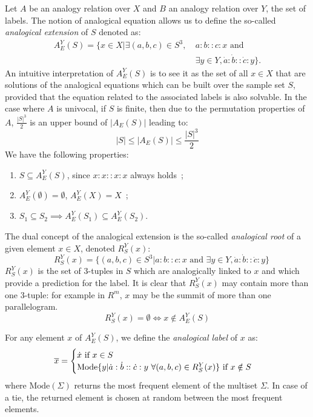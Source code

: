 {Let $A$ be an analogy relation over $X$ and $B$ an analogy relation over $Y$, the set of labels.
The notion of analogical equation allows us to define the so-called {\it
analogical extension} of $S$ denoted as:
\begin{align*}
  A_E^Y(S)=\{ x \in X | \exists (a,b,c) \in S^3, ~ & a:b::c:x \mbox{ and }\\
& \exists y \in Y, \dot{a}:\dot{b}::\dot{c}:y\}.
\end{align*}
An intuitive interpretation of $A_E^Y(S)$ is to see it as the set of all $x \in
X$ that are solutions of the analogical equations which can be built over the
sample set $S$, provided that the equation related to the associated labels is also solvable.
In the case where $A$ is univocal, if $S$ is finite, then due to the
permutation properties of $A$, $\frac{|S|^3}{2}$ is an upper bound of
$|A_E(S)|$ leading to: $$|S| \leq |A_E(S)| \leq \frac{|S|^3}{2}$$
We have the following properties:
\begin{enumerate}
\item $S \subseteq A_E^Y(S)$, since $x:x::x:x$ always holds~;
\item$A_E^Y(\emptyset)=\emptyset$, $A_E^Y(X)=X$~;
\item $S_1 \subseteq S_2 \implies A_E^Y(S_1) \subseteq A_E^Y(S_2)$.
\end{enumerate}

The dual concept of the analogical extension is the so-called {\it analogical
root} of a given element $x \in X$, denoted $R_{S}^Y(x)$:
$$\quad R_{S}^Y(x) = \{(a, b, c) \in S^3 | a:b::c:x \mbox{ and } \exists
y \in Y, \dot{a}:\dot{b}::\dot{c}:y\}$$
$R_{S}^Y(x)$ is the set of 3-tuples in $S$ which are analogically linked to
$x$ and which provide a prediction for the label. It is clear that $R_{S}^Y(x)$ may contain more than one 3-tuple: for
example in $R^m$, $x$ may be the summit of more than one parallelogram.
$$R_{S}^Y(x) = \emptyset \iff x \notin A_E^Y(S)$$

For any element $x$ of $A_E^Y(S)$, we define the \textit{analogical label} of
$x$ as:
$$\overline{x} = \begin{cases}
\dot{x} \text{ if } x \in S\\
\text{Mode} \{y | \dot{a} : \dot{b} :: \dot{c} : y ~ \forall (a, b, c) \in
R_S^Y(x) \} \text{ if } x \notin S
\end{cases}
$$
where $\text{Mode}(\Sigma)$ returns the most frequent element of the multiset
$\Sigma$. In case of a tie, the returned element is chosen at random between
the most frequent elements.

}
